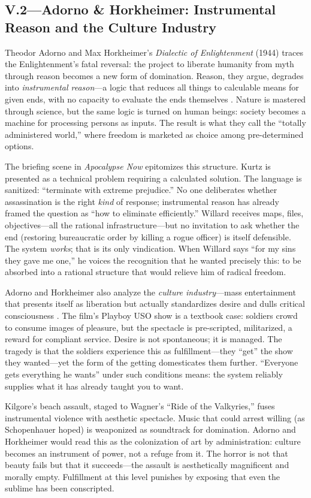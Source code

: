 \subsection*{V.2—Adorno \& Horkheimer: Instrumental Reason and the Culture Industry}
\label{ssec:v-adorno-horkheimer}
Theodor Adorno and Max Horkheimer's \textit{Dialectic of Enlightenment} (1944) traces the 
Enlightenment's fatal reversal: the project to liberate humanity from myth through reason 
becomes a new form of domination. Reason, they argue, degrades into \emph{instrumental 
reason}---a logic that reduces all things to calculable means for given ends, with no capacity 
to evaluate the ends themselves \parencite{AdornoHorkheimer2002}. Nature is mastered through 
science, but the same logic is turned on human beings: society becomes a machine for 
processing persons as inputs. The result is what they call the ``totally administered world,'' 
where freedom is marketed as choice among pre-determined options.

The briefing scene in \textit{Apocalypse Now} epitomizes this structure. Kurtz is presented as 
a technical problem requiring a calculated solution. The language is sanitized: ``terminate 
with extreme prejudice.'' No one deliberates whether assassination is the right \emph{kind} of 
response; instrumental reason has already framed the question as ``how to eliminate 
efficiently.'' Willard receives maps, files, objectives---all the rational infrastructure---but 
no invitation to ask whether the end (restoring bureaucratic order by killing a rogue officer) 
is itself defensible. The system \emph{works}; that is its only vindication. When Willard says 
``for my sins they gave me one,'' he voices the recognition that he wanted precisely this: to 
be absorbed into a rational structure that would relieve him of radical freedom.

Adorno and Horkheimer also analyze the \emph{culture industry}---mass entertainment that 
presents itself as liberation but actually standardizes desire and dulls critical consciousness 
\parencite{AdornoHorkheimer2002}. The film's Playboy USO show is a textbook case: soldiers 
crowd to consume images of pleasure, but the spectacle is pre-scripted, militarized, a reward 
for compliant service. Desire is not spontaneous; it is managed. The tragedy is that the 
soldiers experience this as fulfillment---they ``get'' the show they wanted---yet the form of 
the getting domesticates them further. ``Everyone gets everything he wants'' under such 
conditions means: the system reliably supplies what it has already taught you to want.

Kilgore's beach assault, staged to Wagner's ``Ride of the Valkyries,'' fuses instrumental 
violence with aesthetic spectacle. Music that could arrest willing (as Schopenhauer hoped) is 
weaponized as soundtrack for domination. Adorno and Horkheimer would read this as the 
colonization of art by administration: culture becomes an instrument of power, not a refuge 
from it. The horror is not that beauty fails but that it succeeds---the assault is 
aesthetically magnificent and morally empty. Fulfillment at this level punishes by exposing 
that even the sublime has been conscripted.
